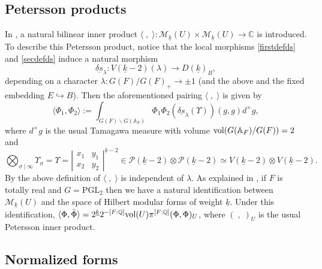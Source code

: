\documentclass{amsart}
\theoremstyle{definition}
\theoremstyle{remark}
\numberwithin{equation}{section}
\newcommand{\PGL}{{\mathrm{PGL}}}
\newcommand{\A}{{\mathbb A}}
\newcommand{\Q}{{\mathbb Q}}
\newcommand{\C}{{\mathbb C}}
\newcommand{\cM}{{\mathcal M}}
\newcommand{\cP}{{\mathcal P}}
\begin{document}
\subsection{Petersson products}

In \cite[\S 3.2]{preprintsanti2}, a natural bilinear inner product $\langle\;,\;\rangle:\cM_{\underline k}(U)\times \cM_{\underline k}(U)\rightarrow\C$ is introduced. To describe this Petersson product, notice that the local morphisms \eqref{firstdefds} and \eqref{secdefds} induce a natural morphism
\begin{equation}\label{deltasdef}
    \underline{\delta s}_\lambda:V(\underline{k}-2)(\lambda)\longrightarrow D(\underline{k})_B,
\end{equation}
depending on a character $\lambda:G(F)/G(F)_+\rightarrow\pm1$ (and the above and the fixed embedding $E\hookrightarrow B$). Then the aforementioned pairing $\langle\;,\;\rangle$ is given by
\begin{equation*}\label{eqpeterssonprod}
    \langle\Phi_1,\Phi_2\rangle:=\int_{G(F)\backslash G(\A_F)}\Phi_1\Phi_2\left(\underline{\delta s}_\lambda(\Upsilon)\right)(g,g)d^\times g,
\end{equation*}
where $d^\times g$ is the usual Tamagawa measure with volume ${\rm vol}(G(\A_F)/G(F))=2$ and
\begin{equation}\label{defUpsilon}
    \bigotimes_{\sigma\mid\infty}\Upsilon_\sigma=\Upsilon=\left|\begin{array}{cc}
    x_1 & y_1 \\
    x_2 & y_2
\end{array}\right|^{\underline k-2}\in \cP(\underline{k}-2)\otimes \cP(\underline{k}-2)\simeq V(\underline{k}-2)\otimes V(\underline{k}-2).
\end{equation}
By \cite[remark 4.13]{preprintsanti2} the above definition of $\langle\;,\;\rangle$ is independent of $\lambda$.
As explained in \cite[Remark 3.2]{preprintsanti2}, if $F$ is totally real and $G=\PGL_2$ then we have a natural identification between $\cM_{\underline{k}}(U)$ and the space of Hilbert modular forms of weight $\underline{k}$. Under this identification, $\langle\Phi,\bar\Phi\rangle=2^{\underline k}2^{-[F:\Q]}{\rm vol}(U)\pi^{[F:\Q]}(\Phi,\Phi)_{U}$, where $(\;,\;)_{U}$ is the usual Petersson inner product.



\subsection{Normalized forms}\label{normforms}
\end{document}
